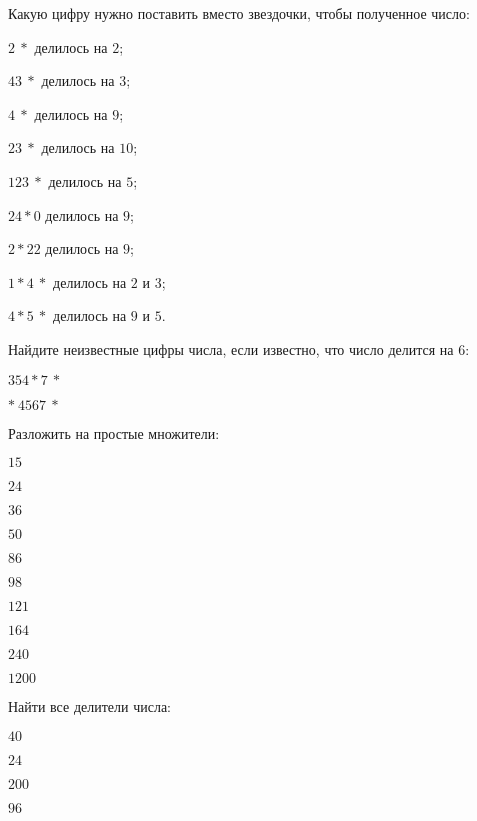 \begin{listofex}
	\item Какую цифру нужно поставить вместо звездочки, чтобы полученное число:
	\begin{enumcols}[itemcolumns=3]
		\item \( 2\:* \) делилось на \( 2 \);
		\item \( 43\:* \) делилось на \( 3 \);
		\item \( 4\:* \) делилось на \( 9 \);
		\item \( 23\:* \) делилось на \( 10 \);
		\item \( 123\:* \) делилось на \( 5 \);
		\item \( 24*0 \) делилось на \( 9 \);
		\item \( 2*22 \) делилось на \( 9 \);
		\item \( 1*4\:* \) делилось на \( 2 \) и \( 3 \);
		\item \( 4*5\:* \) делилось на \( 9 \) и \( 5 \).
	\end{enumcols}
	\item Найдите неизвестные цифры числа, если известно, что число делится на \( 6 \):
	\begin{enumcols}[itemcolumns=2]
		\item \( 354*7\:* \)
		\item \( *\:4567\:* \)
	\end{enumcols}
	\item Разложить на простые множители:
	\begin{enumcols}[itemcolumns=5]
		\item \( 15 \)
		\item \( 24 \)
		\item \( 36 \)
		\item \( 50 \)
		\item \( 86 \)
		\item \( 98 \)
		\item \( 121 \)
		\item \( 164 \)
		\item \( 240 \)
		\item \( 1200 \)
	\end{enumcols}
	\item Найти все делители числа:
	\begin{enumcols}[itemcolumns=4]
		\item \( 40 \)
		\item \( 24 \)
		\item \( 200 \)
		\item \( 96 \)
	\end{enumcols}

\end{listofex}
